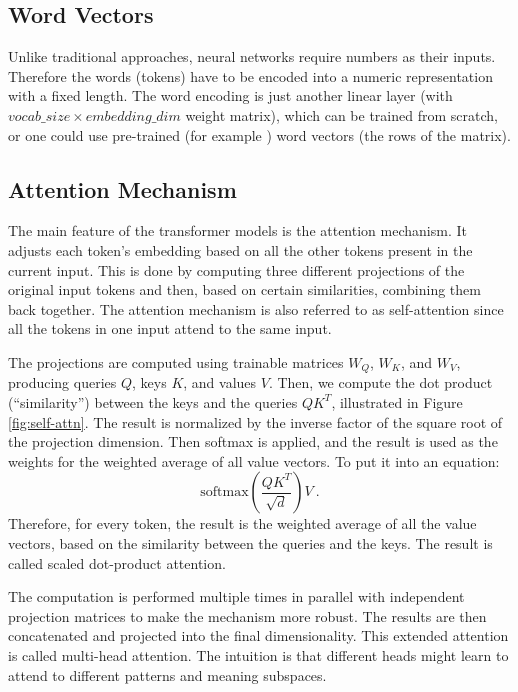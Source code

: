 
\subsection{Word Vectors}

Unlike traditional approaches, neural networks require numbers as their inputs.
Therefore the words (tokens) have to be encoded into a numeric representation with a fixed length.
The word encoding is just another linear layer (with $vocab\_size \times embedding\_dim$ weight matrix), which can be trained from scratch, or one could use pre-trained (for example \citep{glove}) word vectors (the rows of the matrix).

\subsection{Attention Mechanism}
\label{subsec:attention}

The main feature of the transformer models is the attention mechanism. It adjusts each token's embedding based on all the other tokens present in the current input.
This is done by computing three different projections of the original input tokens and then, based on certain similarities, combining them back together. 
The attention mechanism is also referred to as self-attention since all the tokens in one input attend to the same input.

The projections are computed using trainable matrices $W_Q$, $W_K$, and $W_V$, producing queries $Q$, keys $K$, and values $V$. Then, we compute the dot product (``similarity'') between the keys and the queries $QK^T$, illustrated in Figure \ref{fig:self-attn}.
The result is normalized by the inverse factor of the square root of the projection dimension. 
Then softmax is applied, and the result is used as the weights for the weighted average of all value vectors. To put it into an equation: $$\text{softmax}(\frac{QK^T}{\sqrt{d}})V\ .$$
Therefore, for every token, the result is the weighted average of all the value vectors, based on the similarity between the queries and the keys. 
The result is called scaled dot-product attention.

The computation is performed multiple times in parallel with independent projection matrices to make the mechanism more robust.
The results are then concatenated and projected into the final dimensionality.
This extended attention is called multi-head attention.
The intuition is that different heads might learn to attend to different patterns and meaning subspaces.

